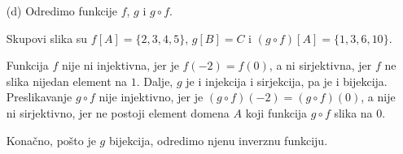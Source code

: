 {{{\begin{enumerate}[(a)]
Skupovi slika su $f[A]=\{0,1,2,3,4\}$, $g[B]=\{0,1,2,3\}$ i $(g\circ f)[A]=\{0,1,2\}$.

Funkcija $f$ je injektivna, jer ne postoje dva razli\v cita elementa njenog domena $A$ koji se slikaju na isti element kodomena $B$. Ona nije i sirjektivna, jer se nijedan element domena ne slika na $5$. Dalje, funkcija $g$ nije ni injektivna, jer je $g(1)=g(3)$, a nije ni sirjektivna, jer ne postoji element domena $B$ koji se slika na $4$. Funkcija $g\circ f$ nije injekcija, jer je $(g\circ f)(-4)=(g\circ f)(4)$, a nije ni sirjekcija, jer se nijedan element njenog domena ne slika na $3$.
\item[(d)] Odredimo funkcije $f$, $g$ i $g\circ f$.
\begin{center}

\end{center}
Skupovi slika su $f[A]=\{2,3,4,5\}$, $g[B]=C$ i $(g\circ f)[A]=\{1,3,6,10\}$.

Funkcija $f$ nije ni injektivna, jer je $f(-2)=f(0)$, a ni sirjektivna, jer $f$ ne slika nijedan element na $1$. Dalje, $g$ je i injekcija i sirjekcija, pa je i bijekcija. Preslikavanje $g\circ f$ nije injektivno, jer je $(g\circ f)(-2)=(g\circ f)(0)$, a nije ni sirjektivno, jer ne postoji element domena $A$ koji funkcija $g\circ f$ slika na $0$.

Kona\v cno, po\v sto je $g$ bijekcija, odredimo njenu inverznu funkciju.
\begin{center}

\end{center}
\end{enumerate}
}


}}

